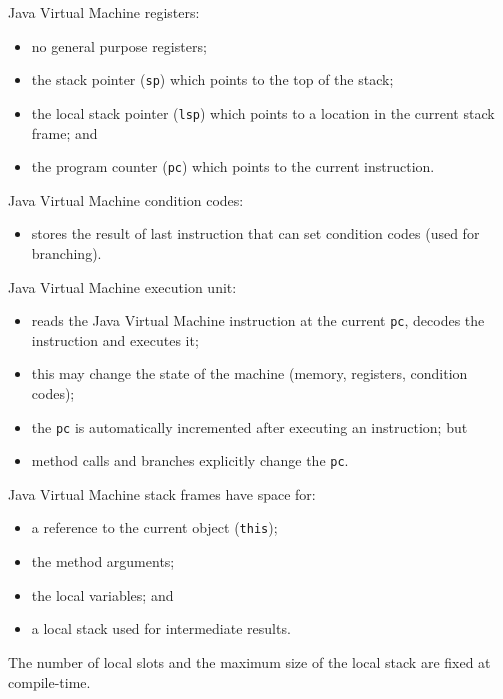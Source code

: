 \begin{slide*}
Java Virtual Machine registers:
\begin{itemize}
\item no general purpose registers;
\item the stack pointer ({\tt sp}) which points to the top of the stack;
\item the local stack pointer ({\tt lsp}) which points to a location in
            the current stack frame; and
\item the program counter ({\tt pc}) which points to the current instruction.
\end{itemize}
\vfil
\end{slide*}

\begin{slide*}
Java Virtual Machine condition codes:
\begin{itemize}
\item stores the result of last instruction that can
       set condition codes (used for branching).
\end{itemize}

Java Virtual Machine execution unit:
\begin{itemize}
\item reads the Java Virtual Machine instruction at the current {\tt pc},
       decodes the instruction and executes it;
\item this may change the state of the machine (memory, registers, condition
 codes);
\item the {\tt pc} is automatically incremented after executing
    an instruction; but
\item method calls and branches explicitly
    change the {\tt pc}.
\end{itemize}
\vfil
\end{slide*}

\begin{slide*}
Java Virtual Machine stack frames have space for:
\begin{itemize}
\item a reference to the current object ({\tt this});
\item the method arguments;
\item the local variables; and
\item a local stack used for intermediate results.
\end{itemize}
The number of local slots and the maximum size of the local stack
are fixed at compile-time.
\vfil
\end{slide*}

